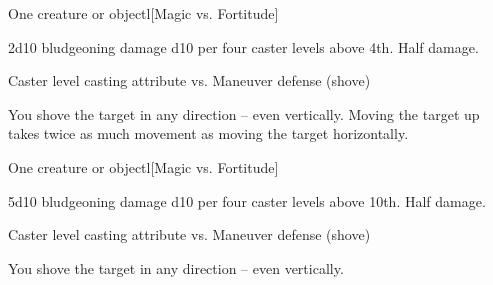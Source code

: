 \begin{spellheader}
    \spellrng{\rngmed}
\end{spellheader}
\begin{spelleffects}
    \begin{spelltarget}{One creature or object}l[Magic vs. Fortitude]
        \begin{spellmargin}
            \spellsuccess 2d10 bludgeoning damage \add d10 per four caster levels above 4th.
            \spellfailure Half damage.
        \end{spellmargin}
        \spellatk Caster level \add casting attribute vs. Maneuver defense (shove)
        \begin{spellmargin}
            \spellsuccess You shove the target in any direction -- even vertically. Moving the target up takes twice as much movement as moving the target horizontally.
        \end{spellmargin}
    \end{spelltarget}
\end{spelleffects}
\begin{spellfooter}
    
\end{spellfooter}

\begin{spellheader}
    \spellrng{\rngmed}
\end{spellheader}
\begin{spelleffects}
    \begin{spelltarget}{One creature or object}l[Magic vs. Fortitude]
        \begin{spellmargin}
            \spellsuccess 5d10 bludgeoning damage \add d10 per four caster levels above 10th.
            \spellfailure Half damage.
        \end{spellmargin}
        \spellatk Caster level \add casting attribute  vs. Maneuver defense (shove)
        \begin{spellmargin}
            \spellsuccess You shove the target in any direction -- even vertically.
        \end{spellmargin}
    \end{spelltarget}
\end{spelleffects}
\begin{spellfooter}
    
\end{spellfooter}

